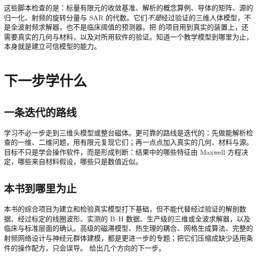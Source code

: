 这些脚本检查的是：标量有限元的收敛基准、解析的概念算例、导体的矩阵、源的归一化、射频的旋转分量与 SAR 的代数。它们\emph{不是}经过验证的三维人体模型，不是全波射频求解器，也不是临床阈值的预测器。把 的项目用到真实的装置上，还需要真实的几何与材料，以及对所用软件的验证。知道一个教学模型到哪里为止，本身就是建立可信模型的能力。

\section{下一步学什么}\label{sec:practice-next}

\subsection{一条迭代的路线}
学习不必一步走到三维头模型或整台磁体。更可靠的路线是迭代的：先做能解析检查的一维、二维问题，用有限元复现它们；再一点点加入真实的几何、材料与源。目标不只是学会操作软件，而是形成判断：结果中的哪些特征由 Maxwell 方程决定，哪些来自材料假设，哪些只是数值近似。

\subsection{本书到哪里为止}
本书的综合项目为建立和检验真实模型打下基础，但不能代替经过验证的解剖数据、经过标定的线圈波形、实测的 B--H 数据、生产级的三维或全波求解器，以及临床与标准层面的确认。高级的磁滞模型、热生理的耦合、网格生成算法、完整的射频网络设计与神经元群体建模，都是更进一步的专题；把它们压缩成缺少适用条件的操作配方，只会误导。 给出几个方向的下一步。

